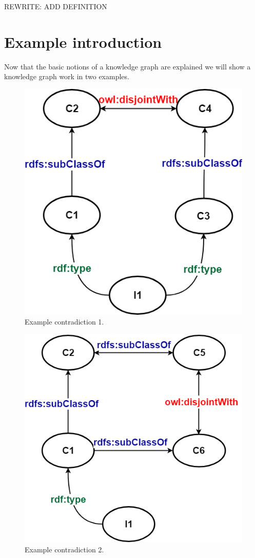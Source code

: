 \documentclass[11pt,letterpaper ,oneside ]{book}
\begin{document}
	REWRITE: ADD DEFINITION
	
	\section{Example introduction}
	Now that the basic notions of a knowledge graph are explained we will show a knowledge graph work in two examples. 
	\begin{figure}
		\centering
		\includegraphics[width=\linewidth]{images/Example1.png}
		\caption{Example contradiction 1.}
		\label{fig:Example1}
	\end{figure}
	\begin{figure}
		\centering
		\includegraphics[width=\linewidth]{images/Example2.png}
		\caption{Example contradiction 2.}
		\label{fig:Example2}
	\end{figure}
	
\end{document}
